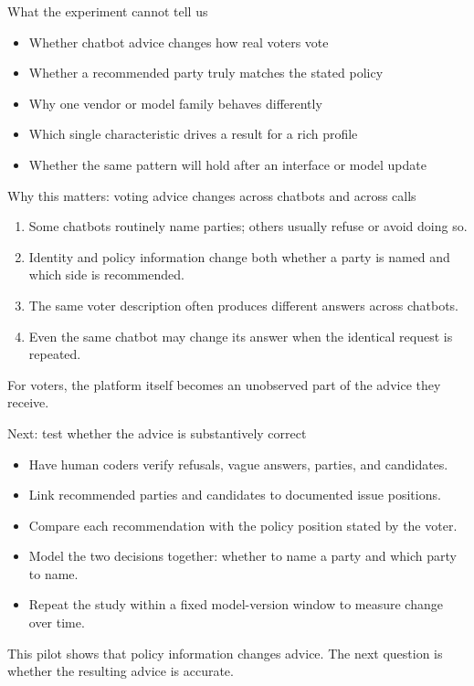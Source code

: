 \documentclass[aspectratio=169,11pt]{beamer}
\begin{document}
\begin{frame}{What the experiment cannot tell us}
\begin{itemize}
\item Whether chatbot advice changes how real voters vote
\item Whether a recommended party truly matches the stated policy
\item Why one vendor or model family behaves differently
\item Which single characteristic drives a result for a rich profile
\item Whether the same pattern will hold after an interface or model update
\end{itemize}
\end{frame}

\begin{frame}{Why this matters: voting advice changes across chatbots and across calls}
\begin{enumerate}
\item Some chatbots routinely name parties; others usually refuse or avoid doing so.
\item Identity and policy information change both whether a party is named and which side is recommended.
\item The same voter description often produces different answers across chatbots.
\item Even the same chatbot may change its answer when the identical request is repeated.
\end{enumerate}
\vspace{.3cm}
For voters, the platform itself becomes an unobserved part of the advice they receive.
\end{frame}
\begin{frame}{Next: test whether the advice is substantively correct}
\begin{itemize}
\item Have human coders verify refusals, vague answers, parties, and candidates.
\item Link recommended parties and candidates to documented issue positions.
\item Compare each recommendation with the policy position stated by the voter.
\item Model the two decisions together: whether to name a party and which party to name.
\item Repeat the study within a fixed model-version window to measure change over time.
\end{itemize}
\vspace{.35cm}
This pilot shows that policy information changes advice. The next question is whether the resulting advice is accurate.
\end{frame}
\end{document}
